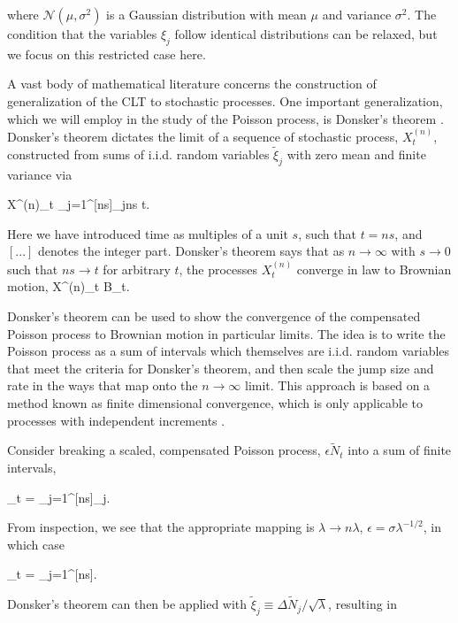 \noindent where $\mathcal{N}(\mu,\sigma^2)$ is a Gaussian distribution with mean $\mu$ and variance $\sigma^2$.  The condition that the variables $\xi_j$ follow identical distributions can be relaxed, but we focus on this restricted case here.  

A vast body of mathematical literature concerns the construction of generalization of the CLT to stochastic processes.  One important generalization, which we will employ in the study of the Poisson process, is Donsker's theorem \cite{jacod2013limit}.  Donsker's theorem dictates the limit of a sequence of stochastic process, $X^{(n)}_t$, constructed from sums of i.i.d. random variables $\tilde{\xi}_j$ with zero mean and finite variance via

\be
X^{(n)}_t \equiv {}\sum_{j=1}^{[ns]}\tilde{\xi}_j\text{, \hspace{.2cm}}ns \equiv t.
\ee

\noindent Here we have introduced time as multiples of a unit $s$, such that $t = ns$, and $[...]$ denotes the integer part.  Donsker's theorem says that as $n\to\infty$ with $s\to 0$ such that $ns\to t$ for arbitrary $t$, the processes $X^{(n)}_t$ converge in law to Brownian motion,
\be
X^{(n)}_t \to B_t.
\ee

\noindent Donsker's theorem can be used to show the convergence of the compensated Poisson process to Brownian motion in particular limits.  The idea is to write the Poisson process as a sum of intervals which themselves are i.i.d. random variables that meet the criteria for Donsker's theorem, and then scale the jump size and rate in the ways that map onto the $n\to\infty$ limit.  This approach is based on a method known as finite dimensional convergence, which is only applicable to processes with independent increments \cite{jacod2013limit}.  

Consider breaking a scaled, compensated Poisson process, $\epsilon \tilde{N}_t$ into a sum of finite intervals,


\be
\epsilon {}_t = \epsilon\sum_{j=1}^{[ns]}\Delta {}_j.
\ee


\noindent From inspection, we see that the appropriate mapping is $\lambda \to n\lambda$, $\epsilon = \sigma\lambda^{-1/2}$, in which case

\be
\epsilon {}_t = \sigma\sum_{j=1}^{[ns]}.
\ee

\noindent  Donsker's theorem can then be applied with $\tilde{\xi}_j \equiv \Delta \tilde{N}_j/\sqrt{\lambda}$, resulting in

